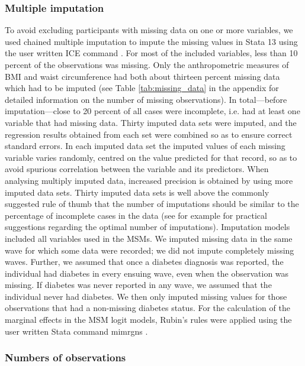\subsubsection{Multiple imputation}

To avoid excluding participants with missing data on one or more variables, we used chained multiple imputation to impute the missing values in Stata 13 using the user written ICE command \parencite{Royston2009}. For most of the included variables, less than 10 percent of the observations was missing. Only the anthropometric measures of \ac{BMI} and waist circumference had both about thirteen percent missing data which had to be imputed (see Table \ref{tab:missing_data} in the appendix for detailed information on the number of missing observations). In total---before imputation---close to 20 percent of all cases were incomplete, i.e. had at least one variable that had missing data. Thirty imputed data sets were imputed, and the regression results obtained from each set were combined so as to ensure correct standard errors. In each imputed data set the imputed values of each missing variable varies randomly, centred on the value predicted for that record, so as to avoid spurious correlation between the variable and its predictors. When analysing multiply imputed data, increased precision is obtained by using more imputed data sets. Thirty imputed data sets is well above the commonly suggested rule of thumb that the number of imputations should be similar to the percentage of incomplete cases in the data (see for example \textcite{White2011,Bodner2008} for practical suggestions regarding the optimal number of imputations). Imputation models included all variables used in the \acp{MSM}. We imputed missing data in the same wave for which some data were recorded; we did not impute completely missing waves. Further, we assumed that once a diabetes diagnosis was reported, the individual had diabetes in every ensuing wave, even when the observation was missing. If diabetes was never reported in any wave, we assumed that the individual never had diabetes. We then only imputed missing values for those observations that had a non-missing diabetes status. For the calculation of the marginal effects in the \ac{MSM} logit models, Rubin's rules were applied using the user written Stata command mimrgns \parencite{Klein2014}.

\subsubsection{Numbers of observations}

